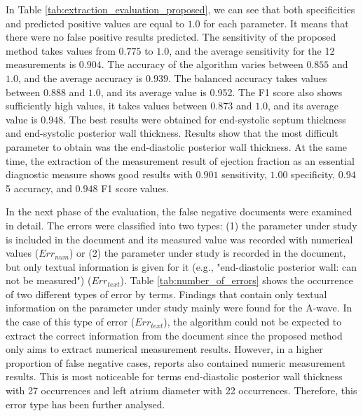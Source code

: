 In Table \ref{tab:extraction_evaluation_proposed}, we can see that both specificities and predicted positive values are equal to $1.0$ for each parameter. It means that there were no false positive results predicted. The sensitivity of the proposed method takes values from $0.775$ to $1.0$, and the average sensitivity for the 12 measurements is $0.904$. The accuracy of the algorithm varies between $0.855$ and $1.0$, and the average accuracy is $0.939$. The balanced accuracy takes values between $0.888$ and $1.0$, and its average value is 0.952. The F1 score also shows sufficiently high values, it takes values between $0.873$ and $1.0$, and its average value is $0.948$. The best results were obtained for end-systolic septum thickness and end-systolic posterior wall thickness. Results show that the most difficult parameter to obtain was the end-diastolic posterior wall thickness. At the same time, the extraction of the measurement result of ejection fraction as an essential diagnostic measure shows good results with $0.901$ sensitivity, $1.00$ specificity, $0.94$5 accuracy, and $0.948$ F1 score values.

In the next phase of the evaluation, the false negative documents were examined in detail. The errors were classified into two types: (1) the parameter under study is included in the document and its measured value was recorded with numerical values ($Err_{num}$) or (2) the parameter under study is recorded in the document, but only textual information is given for it (e.g., "end-diastolic posterior wall: can not be measured") ($Err_{text}$). Table \ref{tab:number_of_errors} shows the occurrence of two different types of error by terms. Findings that contain only textual information on the parameter under study mainly were found for the A-wave. In the case of this type of error ($Err_{text}$), the algorithm could not be expected to extract the correct information from the document since the proposed method only aims to extract numerical measurement results. However, in a higher proportion of false negative cases, reports also contained numeric measurement results. This is most noticeable for terms end-diastolic posterior wall thickness with 27 occurrences and left atrium diameter with 22 occurrences. Therefore, this error type has been further analysed.

